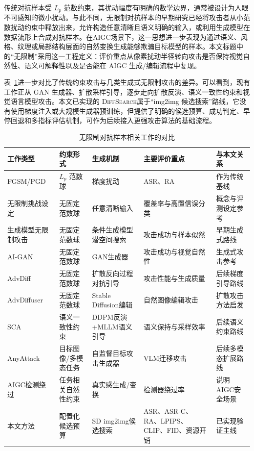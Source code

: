 \documentclass[type=bachelor,oneside]{fduthesis}
\newcommand{\methodname}{\textsc{DiffSearch}}
\newcommand{\tablefont}{\small}
\begin{document}
传统对抗样本受 $L_p$ 范数约束，其扰动幅度有明确的数学边界，通常被设计为人眼不可感知的微小扰动。与此不同，无限制对抗样本的早期研究已经将攻击者从小范数扰动约束中释放出来，允许构造任意清晰且语义明确的输入\cite{brown2018unrestricted}，或利用生成模型在数据流形上合成对抗样本\cite{song2018constructing}。在AIGC场景下，这一思想进一步表现为通过语义、风格、纹理或局部结构层面的自然变换生成能够欺骗目标模型的样本。本文标题中的“无限制”采用这一工程定义：评价重点从像素扰动半径转向攻击是否保持视觉自然性、语义可解释性以及是否能在 AIGC 生成/编辑流程中复现。

表~\ref{tab:unrestricted_compare}进一步对比了传统约束攻击与几类生成式无限制攻击的差异。可以看到，现有工作正从 GAN 生成器、扩散采样引导，逐步走向扩散反演、语义一致性约束和视觉语言模型攻击。本文已实现的 \methodname 属于“img2img 候选搜索”路线，它没有使用梯度注入或大规模生成器预训练，但提供了明确的候选预算、成功判定、早停回退和多指标评估机制，可作为后续接入更强攻击算法的基础流程。

\begin{table}[htbp]
  \centering
  \caption{无限制对抗样本相关工作的对比}
  \label{tab:unrestricted_compare}
  \tablefont
  \begin{tabularx}{\textwidth}{lXXXX}
    \toprule
    工作类型 & 约束形式 & 生成机制 & 主要评价重点 & 与本文关系 \\
    \midrule
    FGSM/PGD & $L_p$ 范数球 & 梯度扰动 & ASR、RA & 作为传统基线 \\
    无限制挑战设定\cite{brown2018unrestricted} & 无固定范数球 & 任意清晰输入 & 覆盖率与高置信误分类 & 概念与评测设定参考 \\
    生成模型无限制攻击\cite{song2018constructing} & 无固定范数球 & 条件生成模型潜空间搜索 & 攻击成功与样本似然 & 早期生成式路线 \\
    AI-GAN\cite{bai2021aigan} & 无固定范数球 & GAN生成器 & 攻击成功与视觉自然性 & 生成式攻击参考 \\
    AdvDiff\cite{dai2023advdiff} & 无固定范数球 & 扩散反向过程对抗引导 & 攻击性能与生成质量 & 后续梯度引导路线 \\
    AdvDiffuser\cite{chen2023advdiffuser} & 无固定范数球 & Stable Diffusion编辑 & 自然图像编辑攻击 & 扩散攻击方法启发 \\
    SCA\cite{pan2024sca} & 语义一致性约束 & DDPM反演+MLLM语义引导 & 语义保持与采样效率 & 后续语义约束路线 \\
    AnyAttack\cite{zhang2024anyattack} & 目标图像/多模态任务 & 自监督目标攻击生成器 & VLM迁移攻击 & 后续多模态扩展路线 \\
    AIGC检测绕过\cite{xie2025takefake} & 任务相关自然性约束 & 真实感生成/变换 & 检测器绕过率 & 说明AIGC安全场景 \\
    本文方法 & 配置化候选预算 & SD img2img候选搜索 & ASR、ASR-C、RA、LPIPS、CLIP、FID、资源开销 & 已实现验证主线 \\
    \bottomrule
  \end{tabularx}
\end{table}
\end{document}
